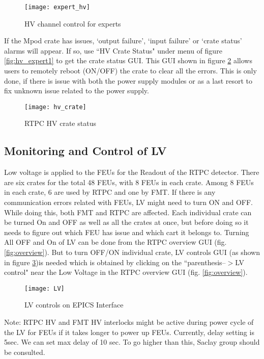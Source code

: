 \begin{figure}[H]
	\centering
	\texttt{[image: expert\_hv]}
	\caption{HV channel control for experts}
	\label{fig:expert_hv}
\end{figure}

If the Mpod crate has issues, `output failure', `input failure' or `crate status' alarms will appear. If so, use ``HV Crate Status" under menu of figure \ref{fig:hv_expert1} to get the crate status GUI. This GUI shown in figure \ref{fig:hv_crate} allows users to remotely reboot (ON/OFF) the crate to clear all the errors. This is only done, if there is issue with both the power supply modules or as a last resort to fix unknown issue related to the power supply.
\begin{figure}[H]
	\centering
	\texttt{[image: hv\_crate]}
	\caption{RTPC HV crate status}
	\label{fig:hv_crate}
\end{figure}

\subsection{Monitoring and Control of LV}
\label{sub-sec:LV_control}

Low voltage is applied to the FEUs for the Readout of the RTPC detector. There are six crates for the total 48 FEUs, with 8 FEUs in each crate. Among 8 FEUs in each crate, 6 are used by RTPC and one by FMT. If there is any communication errors related with FEUs, LV might need to turn ON and OFF. While doing this, both FMT and RTPC are affected. Each individual crate can be turned On and OFF as well as all the crates at once, but before doing so it needs to figure out which FEU has issue and which cart it belongs to. Turning All OFF and On of LV can be done from the RTPC overview GUI (fig. \ref{fig:overview}). But to turn OFF/ON individual crate, LV controls GUI (as shown in figure \ref{fig:LV})is needed which is obtained by clicking on the ``parenthesis--$>$LV control" near the Low Voltage in the RTPC overview GUI (fig. \ref{fig:overview}).

\begin{figure}[H]
	\centering
	\texttt{[image: LV]}
	\caption{LV controls on EPICS Interface}
	\label{fig:LV}
\end{figure}
 {\color{red} Note:} RTPC HV and FMT HV interlocks might be active during power cycle of the LV for FEUs if it takes longer to power up FEUs. Currently, delay setting is 5sec. We can set max delay of 10 sec. To go higher than this, Saclay group should be consulted. 

